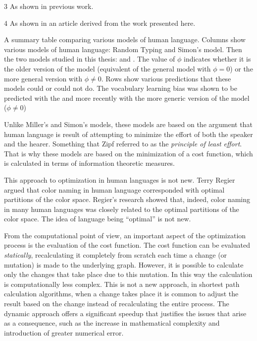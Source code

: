 \begin{table}
\begin{adjustbox}{max width=\textwidth}
\begin{threeparttable}
\begin{tablenotes}
        \item [3] As shown in previous work. \cite{Ferrer2017a}
        \item [4] As shown in an article \cite{Carrera2021a} derived from the work presented here.
      \end{tablenotes}
    \end{threeparttable}
  \end{adjustbox}
  \caption{
    A summary table comparing various models of human language.
    Columns show various models of human language: Random Typing and Simon's model.
    Then the two models studied in this thesis: \firstm{} and \secondmodel{}.
    The value of $\phi$ indicates whether it is the older version of the model (equivalent of the general model with $\phi=0$) or the more general version with $\phi \neq 0$.
    Rows show various predictions that these models could or could not do.
    The vocabulary learning bias was shown to be predicted with the \firstmodel{} and more recently with the more generic version of the model ($\phi \neq 0$)
  }
  \label{tab:comparison_models}
\end{table}


Unlike Miller's and Simon's models, these models are based on the argument that human language is result of attempting to minimize the effort of both the speaker and the hearer. \cite{Ferrer2003a} \cite{Zipf1949a} Something that Zipf referred to as the \emph{principle of least effort}. That is why these models are based on the minimization of a cost function, which is calculated in terms of information theoretic measures.

This approach to optimization in human languages is not new.
Terry Regier argued \cite{Regier2007a} that color naming in human language corresponded with optimal partitions of the color space.
Regier's research showed that, indeed, color naming in many human languages was closely related to the optimal partitions of the color space.
The idea of language being ``optimal'' is not new.

From the computational point of view, an important aspect of the optimization process is the evaluation of the cost function.
The cost function can be evaluated \emph{statically}, recalculating it completely from scratch each time a change (or mutation) is made to the underlying graph.
However, it is possible to calculate only the changes that take place due to this mutation.
In this way the calculation is computationally less complex.
This is not a new approach, in shortest path calculation algorithms, when a change takes place it is common to adjust the result based on the change instead of recalculating the entire process. \cite{Buriol2003a}
The dynamic approach offers a significant speedup that justifies the issues that arise as a consequence, such as the increase in mathematical complexity and introduction of greater numerical error.

